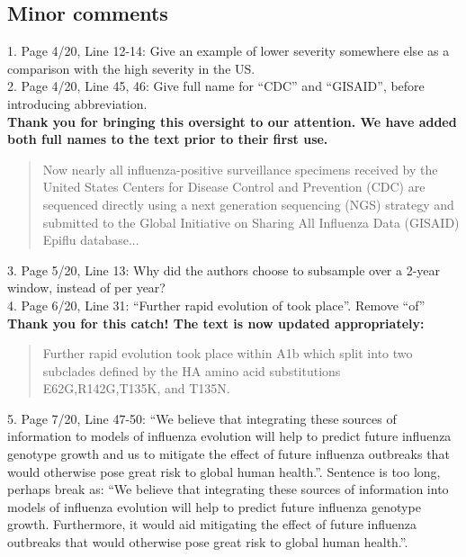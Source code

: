 \documentclass[11pt,oneside,letterpaper]{article}
\begin{document}
\subsection*{Minor comments}
1. Page 4/20, Line 12-14: Give an example of lower severity somewhere else as a comparison with the high severity in the US.\\

2. Page 4/20, Line 45, 46: Give full name for “CDC” and “GISAID”, before introducing abbreviation.\\

\textbf{Thank you for bringing this oversight to our attention. We have added both full names to the text prior to their first use.}

\begin{quotation}
Now nearly all influenza-positive surveillance specimens received by the United States Centers for Disease Control and Prevention (CDC) are sequenced directly using a next generation sequencing (NGS) strategy and submitted to the Global Initiative on Sharing All Influenza Data (GISAID) Epiflu database...
\end{quotation}

3. Page 5/20, Line 13: Why did the authors choose to subsample over a 2-year window, instead of per year?\\

4. Page 6/20, Line 31: “Further rapid evolution of took place”. Remove “of”\\

\textbf{Thank you for this catch! The text is now updated appropriately:}

\begin{quotation}
  Further rapid evolution took place within A1b which split into two subclades defined by the HA amino acid substitutions E62G,R142G,T135K, and T135N.
\end{quotation}

5. Page 7/20, Line 47-50: “We believe that integrating these sources of information to models of influenza evolution will help to predict future influenza genotype growth and us to mitigate the effect of future influenza outbreaks that would otherwise pose great risk to global human health.”. Sentence is too long, perhaps break as: “We believe that integrating these sources of information into models of influenza evolution will help to predict future influenza genotype growth. Furthermore, it would aid mitigating the effect of future influenza outbreaks that would otherwise pose great risk to global human health.”.\\
\end{document}
